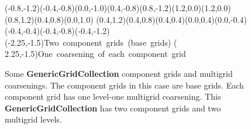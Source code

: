 \documentclass{article}
\begin{document}
\begin{figure}[htb]
\begin{center}
{{      \psecurve(-0.8,-1.2)(-0.4,-0.8)(0.0,-1.0)(0.4,-0.8)(0.8,-1.2)(1.2,0.0)(1.2,0.0)(0.8,1.2)(0.4,0.8)(0.0,1.0)%
      \psecurve(0.4,1.2)(0.4,0.8)(0.4,0.4)(0.0,0.4)(0.0,-0.4)(-0.4,-0.4)(-0.4,-0.8)(-0.4,-1.2)%
    }%
  }%
  (-2.25,-1.5){\mbox{\hss Two component grids (base grids)\hss}}
  ( 2.25,-1.5){\mbox{\hss One coarsening of each component grid\hss}}
\endpspicture\end{center}
\caption[Some \textbf{GenericGridCollection} component grids and multigrid coarsenings]
        {Some \textbf{GenericGridCollection} component grids and multigrid coarsenings.
         The component grids in this case are base grids.  Each component grid has one level-one multigrid coarsening.
         This \textbf{GenericGridCollection} has two component grids and two multigrid levels.
        \label{GenericGridCollection:ComponentGridsAndCoarsenings}}
\end{figure}
\end{document}

